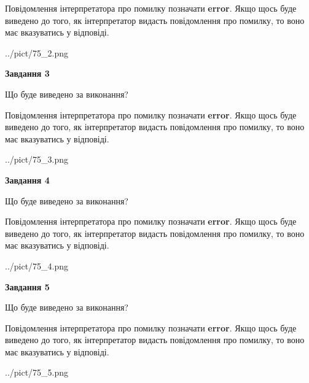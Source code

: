 \documentclass[12pt, ukrainian]{article}
\begin{document}
{\begin {large}
Повідомлення інтерпретатора про помилку позначати \textbf{error}.
Якщо щось буде виведено до того, як інтерпретатор видасть повідомлення про помилку, 
то воно має вказуватись у відповіді. \par


\begin{center}
	{../pict/75_2.png}
\end{center}
\newpage

{\begin {center}\textbf{Завдання 3}\end {center}}\par
Що буде виведено за виконання?

Повідомлення інтерпретатора про помилку позначати \textbf{error}.
Якщо щось буде виведено до того, як інтерпретатор видасть повідомлення про помилку, 
то воно має вказуватись у відповіді. \par


\begin{center}
	{../pict/75_3.png}
\end{center}
\newpage

{\begin {center}\textbf{Завдання 4}\end {center}}\par
Що буде виведено за виконання?

Повідомлення інтерпретатора про помилку позначати \textbf{error}.
Якщо щось буде виведено до того, як інтерпретатор видасть повідомлення про помилку, 
то воно має вказуватись у відповіді. \par


\begin{center}
	{../pict/75_4.png}
\end{center}
\newpage

{\begin {center}\textbf{Завдання 5}\end {center}}\par
Що буде виведено за виконання?

Повідомлення інтерпретатора про помилку позначати \textbf{error}.
Якщо щось буде виведено до того, як інтерпретатор видасть повідомлення про помилку, 
то воно має вказуватись у відповіді. \par


\begin{center}
	{../pict/75_5.png}
\end{center}
\newpage


\end{large}}
\end{document}

